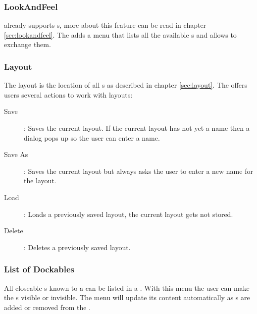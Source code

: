 \subsubsection{LookAndFeel} \label{sec:menu:lookandfeel}
 already supports s, more about this feature can be read in chapter \ref{sec:lookandfeel}. The  adds a menu that lists all the available s and allows to exchange them.



\subsubsection{Layout}
The layout is the location of all s as described in chapter \ref{sec:layout}. The  offers users several actions to work with layouts:
\begin{description}
 \item [Save]: Saves the current layout. If the current layout has not yet a name then a dialog pops up so the user can enter a name.
 \item [Save As]: Saves the current layout but always asks the user to enter a new name for the layout.
 \item [Load]: Loads a previously saved layout, the current layout gets not stored.
 \item [Delete]: Deletes a previously saved layout.
\end{description}

\subsubsection{List of Dockables}
All closeable s known to a  can be listed in a \linebreak {}. With this menu the user can make the \linebreak {}s visible or invisible. The menu will update its content automatically as s are added or removed from the .

